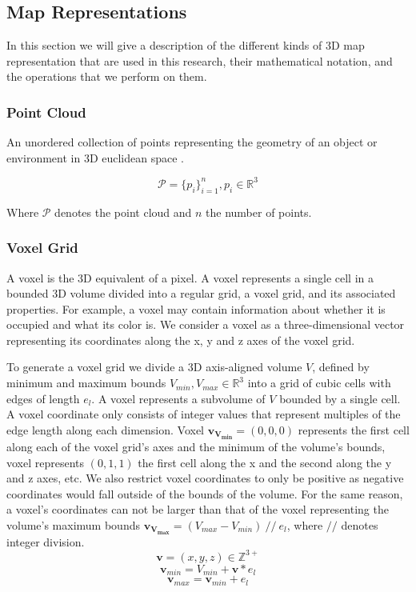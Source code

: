 \subsection{Map Representations}
In this section we will give a description of the different kinds of 3D map representation that are used in this research, their mathematical notation, and the operations that we perform on them.

\subsubsection{Point Cloud}
An unordered collection of points representing the geometry of an object or environment in 3D euclidean space \citep{volodine_point_2007}.

\begin{equation}
\mathcal{P}=\{p_i\}_{i=1}^n, p_i \in \mathbb{R}^3
\end{equation}

Where \(\mathcal{P}\) denotes the point cloud and \(n\) the number of points.

\subsubsection{Voxel Grid}
A voxel is the 3D equivalent of a pixel. A voxel represents a single cell in a bounded 3D volume divided into a regular grid, a voxel grid, and its associated properties. For example, a voxel may contain information about whether it is occupied and what its color is. We consider a voxel as a three-dimensional vector representing its coordinates along the x, y and z axes of the voxel grid. 

To generate a voxel grid we divide a 3D axis-aligned volume \(V\), defined by minimum and maximum bounds \(V_{min}, V_{max} \in \mathbb{R}^{3}\) into a grid of cubic cells with edges of length \(e_{l}\). A voxel represents a subvolume of \(V\) bounded by a single cell. A voxel coordinate only consists of integer values that represent multiples of the edge length along each dimension. Voxel \(\boldsymbol{v_{V_{min}}} = (0,0,0)\) represents the first cell along each of the voxel grid's axes and the minimum of the volume's bounds, voxel represents \((0,1,1)\) the first cell along the x and the second along the y and z axes, etc. We also restrict voxel coordinates to only be positive as negative coordinates would fall outside of the bounds of the volume. For the same reason, a voxel's coordinates can not be larger than that of the voxel representing the volume's maximum bounds \(\boldsymbol{v_{V_{max}}} = (V_{max} - V_{min})\ //\ e_l\), where \(//\) denotes integer division. 
\begin{equation}
\boldsymbol{v} = (x, y, z) \in \mathbb{Z}^{3+}
\end{equation}
\begin{equation}
    \label{eq:vmin}
\boldsymbol{v}_{min} = V_{min} + \boldsymbol{v}*e_{l}
\end{equation}
\begin{equation}
    \label{eq:vmax}
\boldsymbol{v}_{max} = \boldsymbol{v}_{min} + e_{l}
\end{equation}

